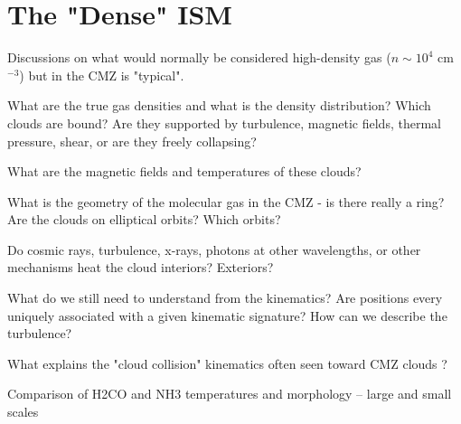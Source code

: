 \section{The "Dense" ISM}
Discussions on what would normally be considered high-density gas ($n\sim10^4$ cm$^{-3}$) but in the CMZ is "typical".

What are the true gas densities and what is the density distribution?  Which clouds are bound?  Are they supported by turbulence, magnetic fields, thermal pressure, shear, or are they freely collapsing?

What are the magnetic fields and temperatures of these clouds?

What is the geometry of the molecular gas in the CMZ - is there really a ring?  Are the clouds on elliptical orbits?  Which orbits?

Do cosmic rays, turbulence, x-rays, photons at other wavelengths, or other mechanisms heat the cloud interiors?  Exteriors?

What do we still need to understand from the kinematics?  Are positions every uniquely associated with a given kinematic signature?  How can we describe the turbulence?

What explains the "cloud collision" kinematics often seen toward CMZ clouds \citep{Tanaka2015a,Tanaka2014a,Oka2012a}?

Comparison of H2CO and NH3 temperatures and morphology -- large and small scales